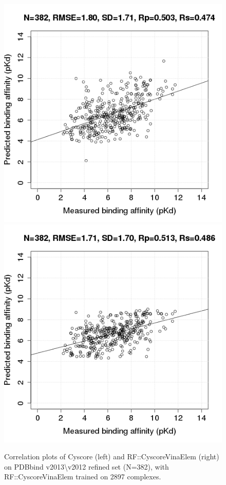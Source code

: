 \documentclass[journal=jacsat,manuscript=article]{achemso}
\begin{document}
\begin{figure}[h]
\includegraphics[width=1.4\linewidth,natwidth=480,natheight=480]{../rfcyscore/x4/mlr/trn-247-tst-382-yp.png}
\endminipage
{}
\includegraphics[width=1.4\linewidth,natwidth=480,natheight=480]{../rfcyscore/x46/rf/trn-2897-tst-382-yp.png}
\endminipage
\caption{Correlation plots of Cyscore (left) and RF::CyscoreVinaElem (right) on PDBbind v2013\textbackslash v2012 refined set (N=382), with RF::CyscoreVinaElem trained on 2897 complexes.}
\label{fig:tst382}
\end{figure}
\end{document}
